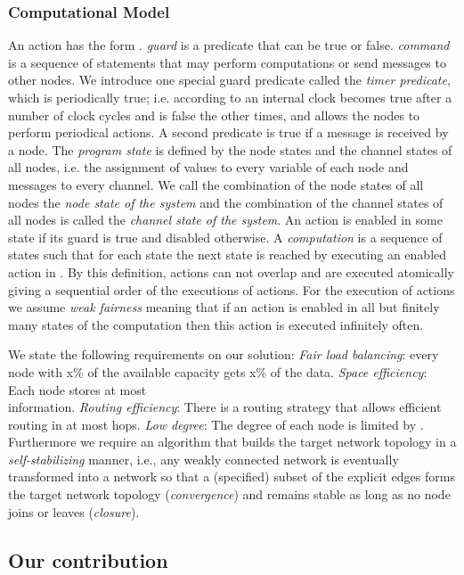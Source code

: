 \documentclass[11pt]{article}
\begin{document}
\subsubsection{Computational Model}
An action has the form . \emph{guard} is a
predicate that can be true or false. \emph{command} is a sequence of
statements that may perform computations or send messages to other nodes. We
introduce one special guard predicate  called the \emph{timer
predicate}, which is periodically true; i.e. according to an internal clock  becomes true after a number of clock cycles and is false  the other times,  and allows the nodes to perform
periodical actions. A second predicate is true if a message is received by a
node.
The \emph{program state} is defined by the node states and the channel
states of all nodes, i.e. the assignment of values to every variable of each
node and messages to every channel. We call the combination of the node
states of all nodes the \emph{node state of the system} and the combination
of the channel states of all nodes is called the \emph{channel state of the
system}.
An action is enabled in some state if its guard is true and disabled
otherwise.
A \emph{computation} is a sequence of states such that for each state 
the next state  is reached by executing an enabled action in .
By this definition, actions can not overlap and are executed atomically
giving a sequential order of the executions of actions. For the execution of
actions we assume \emph{weak fairness} meaning that if an action is enabled
in all but finitely many states of the computation then this action is
executed infinitely often.

We state the following requirements on our solution: \emph{Fair load
balancing}: every node with x\% of the available capacity gets x\% of the
data. \emph{Space efficiency}: Each node stores at most\\  information. \emph{Routing
efficiency}: There is a routing strategy that allows efficient routing in at
most  hops. \emph{Low degree}: The degree of each node is
limited by . Furthermore we require an algorithm that
builds the target network topology in a \emph{self-stabilizing} manner, i.e.,
any weakly connected network  is eventually transformed into a
network so that a (specified) subset of the explicit edges forms the target
network topology ({\em convergence}) and remains stable as long as no node
joins or leaves ({\em closure}).

\subsection{Our contribution}
\end{document}
